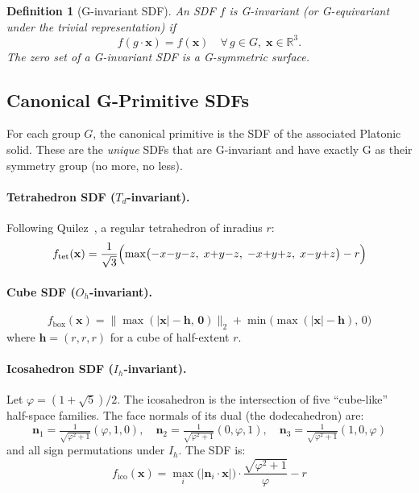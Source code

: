 \documentclass[11pt, a4paper]{article}
\newtheorem{definition}{Definition}[section]
\newcommand{\R}{\mathbb{R}}
\newcommand{\norm}[1]{\lVert #1 \rVert}
\newcommand{\Td}{T_d}
\newcommand{\Oh}{O_h}
\newcommand{\Ih}{I_h}
\begin{document}
\begin{definition}[G-invariant SDF]
An SDF $f$ is \emph{G-invariant} (or \emph{G-equivariant under the trivial
representation}) if
\begin{equation}
  f(g \cdot \mathbf{x}) = f(\mathbf{x}) \quad \forall\, g \in G,\; \mathbf{x} \in \R^3.
  \label{eq:invariant}
\end{equation}
The zero set of a G-invariant SDF is a G-symmetric surface.
\end{definition}

\subsection{Canonical G-Primitive SDFs}
\label{sec:primitives}

For each group $G$, the canonical primitive is the SDF of the associated
Platonic solid. These are the \emph{unique} SDFs that are G-invariant and
have exactly G as their symmetry group (no more, no less).

\paragraph{Tetrahedron SDF ($\Td$-invariant).}
Following Quilez~\cite{quilez_sdf}, a regular tetrahedron of inradius $r$:
\begin{equation}
  f_{\mathrm{tet}}(\mathbf{x}) = \frac{1}{\sqrt{3}}\Bigl(
    \max\bigl(-x{-}y{-}z,\; x{+}y{-}z,\; {-}x{+}y{+}z,\; x{-}y{+}z\bigr) - r
  \Bigr)
  \label{eq:tet}
\end{equation}

\paragraph{Cube SDF ($\Oh$-invariant).}
\begin{equation}
  f_{\mathrm{box}}(\mathbf{x}) = \norm{\max(\lvert\mathbf{x}\rvert - \mathbf{h},\, \mathbf{0})}_2
  + \min\bigl(\max(|\mathbf{x}| - \mathbf{h}),\, 0\bigr)
  \label{eq:box}
\end{equation}
where $\mathbf{h} = (r, r, r)$ for a cube of half-extent $r$.

\paragraph{Icosahedron SDF ($\Ih$-invariant).}
Let $\varphi = (1+\sqrt{5})/2$. The icosahedron is the intersection of five
``cube-like'' half-space families. The face normals of its dual (the
dodecahedron) are:
\begin{equation}
  \mathbf{n}_1 = \tfrac{1}{\sqrt{\varphi^2+1}}(\varphi, 1, 0), \quad
  \mathbf{n}_2 = \tfrac{1}{\sqrt{\varphi^2+1}}(0, \varphi, 1), \quad
  \mathbf{n}_3 = \tfrac{1}{\sqrt{\varphi^2+1}}(1, 0, \varphi)
\end{equation}
and all sign permutations under $\Ih$. The SDF is:
\begin{equation}
  f_{\mathrm{ico}}(\mathbf{x}) = \max_{i}\bigl(\lvert \mathbf{n}_i \cdot \mathbf{x} \rvert\bigr)
  \cdot \frac{\sqrt{\varphi^2+1}}{\varphi} - r
  \label{eq:ico}
\end{equation}
\end{document}
